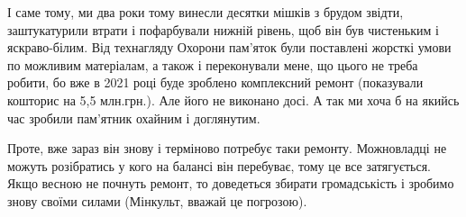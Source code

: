 І саме тому, ми два роки тому винесли десятки мішків з брудом звідти,
заштукатурили втрати і пофарбували нижній рівень, щоб він був чистеньким і
яскраво-білим. Від технагляду Охорони пам'яток були поставлені жорсткі умови по
можливим матеріалам, а також і переконували мене, що цього не треба робити, бо
вже в 2021 році буде зроблено комплексний ремонт (показували кошторис на 5,5
млн.грн.). Але його не виконано досі. А так ми хоча б на якийсь час зробили
пам'ятник охайним і доглянутим. 

Проте, вже зараз він знову і терміново потребує таки ремонту. Можновладці не
можуть розібратись у кого на балансі він перебуває, тому це все затягується.
Якщо весною не почнуть ремонт, то доведеться збирати громадськість і зробимо
знову своїми силами (Мінкульт, вважай це погрозою). 
